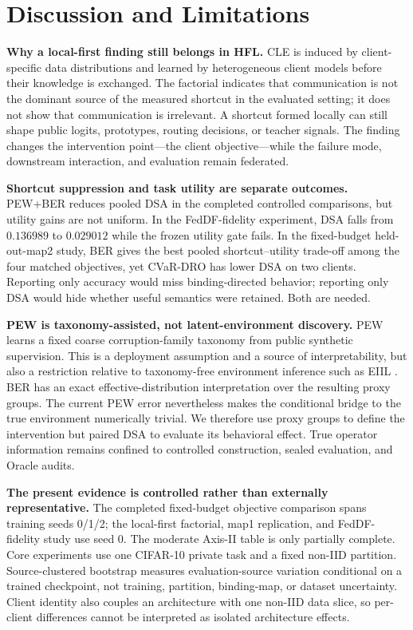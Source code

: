 \section{Discussion and Limitations}

\textbf{Why a local-first finding still belongs in HFL.}
CLE is induced by client-specific data distributions and learned by heterogeneous client models before their knowledge is exchanged. The factorial indicates that communication is not the dominant source of the measured shortcut in the evaluated setting; it does not show that communication is irrelevant. A shortcut formed locally can still shape public logits, prototypes, routing decisions, or teacher signals. The finding changes the intervention point---the client objective---while the failure mode, downstream interaction, and evaluation remain federated.

\textbf{Shortcut suppression and task utility are separate outcomes.}
PEW+BER reduces pooled DSA in the completed controlled comparisons, but utility gains are not uniform. In the FedDF-fidelity experiment, DSA falls from \(0.136989\) to \(0.029012\) while the frozen utility gate fails. In the fixed-budget held-out-map2 study, BER gives the best pooled shortcut--utility trade-off among the four matched objectives, yet CVaR-DRO has lower DSA on two clients. Reporting only accuracy would miss binding-directed behavior; reporting only DSA would hide whether useful semantics were retained. Both are needed.

\textbf{PEW is taxonomy-assisted, not latent-environment discovery.}
PEW learns a fixed coarse corruption-family taxonomy from public synthetic supervision. This is a deployment assumption and a source of interpretability, but also a restriction relative to taxonomy-free environment inference such as EIIL \citep{creager2021eiil}. BER has an exact effective-distribution interpretation over the resulting proxy groups. The current PEW error nevertheless makes the conditional bridge to the true environment numerically trivial. We therefore use proxy groups to define the intervention but paired DSA to evaluate its behavioral effect. True operator information remains confined to controlled construction, sealed evaluation, and Oracle audits.

\textbf{The present evidence is controlled rather than externally representative.}
The completed fixed-budget objective comparison spans training seeds 0/1/2; the local-first factorial, map1 replication, and FedDF-fidelity study use seed 0. The moderate Axis-II table is only partially complete. Core experiments use one CIFAR-10 private task and a fixed non-IID partition. Source-clustered bootstrap measures evaluation-source variation conditional on a trained checkpoint, not training, partition, binding-map, or dataset uncertainty. Client identity also couples an architecture with one non-IID data slice, so per-client differences cannot be interpreted as isolated architecture effects.

